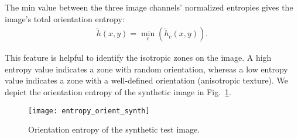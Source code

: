 The min value between the three image channels' normalized entropies gives the image's total orientation entropy:
\begin{gather}
    \widetilde{h}(x,y) = \underset{c}{\min}\left(\widetilde{h}_c(x,y)\right). \label{eq:entropy_orient}
\end{gather}

This feature is helpful to identify the isotropic zones on the image. A high entropy value indicates a zone with random orientation, whereas a low entropy value indicates a zone with a well-defined orientation (anisotropic texture). We depict the orientation entropy of the synthetic image in Fig.\ \ref{fig:entropy_orient_synth}.

\begin{figure}[!ht]
	\texttt{[image: entropy\_orient\_synth]}
    \caption{Orientation entropy of the synthetic test image.}
    \label{fig:entropy_orient_synth}
\end{figure}

%                  


